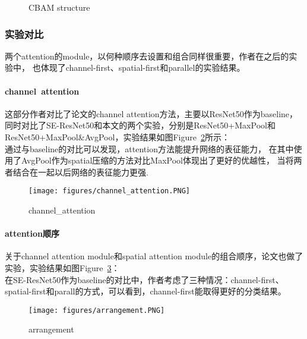 \documentclass{article}
\begin{document}
\begin{CJK}{UTF8}{gbsn}
\begin{figure}[!ht]
{
         \label{fig:cf} } 
    \caption{CBAM structure} 
    \label{fig:cs} 
\end{figure}

\subsubsection{实验对比}
两个attention的module，以何种顺序去设置和组合同样很重要，作者在之后的实验中，
也体现了channel-first、spatial-first和parallel的实验结果。
\paragraph{channel\ attention\\}
这部分作者对比了论文的channel attention方法，主要以ResNet50作为baseline，
同时对比了SE-ResNet50和本文的两个实验，分别是ResNet50+MaxPool和
ResNet50+MaxPool\&AvgPool，实验结果如图Figure~\ref{fig:channel_attention}所示：\\
通过与baseline的对比可以发现，attention方法能提升网络的表征能力，
在其中使用了AvgPool作为spatial压缩的方法对比MaxPool体现出了更好的优越性，
当将两者结合在一起以后网络的表征能力更强.
\begin{figure}
    \centering
    \texttt{[image: figures/channel\_attention.PNG]}
    \caption{channel\_attention}
    \label{fig:channel_attention}
\end{figure}
\paragraph{attention顺序}
关于channel attention module和spatial attention module的组合顺序，论文也做了实验，实验结果如图Figure~\ref{fig:arrangement}：\\
在SE-ResNet50作为baseline的对比中，作者考虑了三种情况：channel-first、spatial-first和parall的方式，可以看到，channel-first能取得更好的分类结果。
\begin{figure}
    \centering
    \texttt{[image: figures/arrangement.PNG]}
    \caption{arrangement}
    \label{fig:arrangement}
\end{figure}


\end{CJK}
\end{document}
